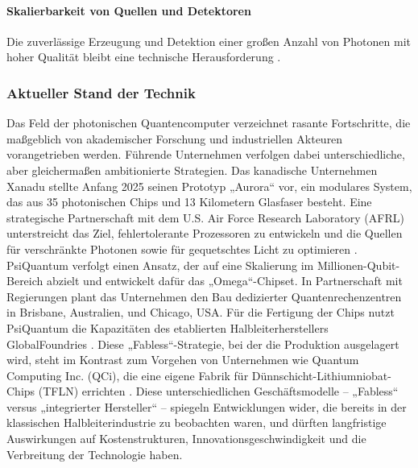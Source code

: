 \paragraph{Skalierbarkeit von Quellen und Detektoren}
Die zuverlässige Erzeugung und Detektion einer großen Anzahl von Photonen mit hoher Qualität bleibt eine technische Herausforderung \cite{LinearOpticsScalable}.

\subsubsection{Aktueller Stand der Technik}
Das Feld der photonischen Quantencomputer verzeichnet rasante Fortschritte, die maßgeblich von akademischer Forschung und industriellen Akteuren vorangetrieben werden. Führende Unternehmen verfolgen dabei unterschiedliche, aber gleichermaßen ambitionierte Strategien.
Das kanadische Unternehmen Xanadu stellte Anfang 2025 seinen Prototyp „Aurora“ vor, ein modulares System, das aus 35 photonischen Chips und 13 Kilometern Glasfaser besteht. Eine strategische Partnerschaft mit dem U.S. Air Force Research Laboratory (AFRL) unterstreicht das Ziel, fehlertolerante Prozessoren zu entwickeln und die Quellen für verschränkte Photonen sowie für gequetschtes Licht zu optimieren \cite{kareemXanaduUSAir2025}.
PsiQuantum verfolgt einen Ansatz, der auf eine Skalierung im Millionen-Qubit-Bereich abzielt und entwickelt dafür das „Omega“-Chipset. In Partnerschaft mit Regierungen plant das Unternehmen den Bau dedizierter Quantenrechenzentren in Brisbane, Australien, und Chicago, USA. Für die Fertigung der Chips nutzt PsiQuantum die Kapazitäten des etablierten Halbleiterherstellers GlobalFoundries \cite{DARPAEyesCompanies}. Diese „Fabless“-Strategie, bei der die Produktion ausgelagert wird, steht im Kontrast zum Vorgehen von Unternehmen wie Quantum Computing Inc. (QCi), die eine eigene Fabrik für Dünnschicht-Lithiumniobat-Chips (TFLN) errichten \cite{QuantumComputingInc}. Diese unterschiedlichen Geschäftsmodelle – „Fabless“ versus „integrierter Hersteller“ – spiegeln Entwicklungen wider, die bereits in der klassischen Halbleiterindustrie zu beobachten waren, und dürften langfristige Auswirkungen auf Kostenstrukturen, Innovationsgeschwindigkeit und die Verbreitung der Technologie haben. \newline
